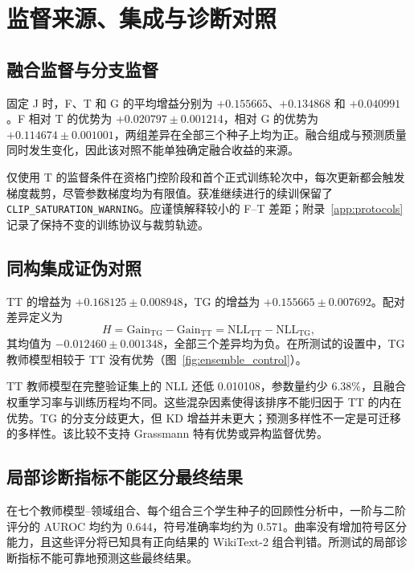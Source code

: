 \section{监督来源、集成与诊断对照}\label{sec:controls}

\subsection{融合监督与分支监督}
\label{sec:source-ablation}
固定 J 时，F、T 和 G 的平均增益分别为 $+0.155665$、$+0.134868$ 和 $+0.040991$。F 相对 T 的优势为 $+0.020797\pm0.001214$，相对 G 的优势为 $+0.114674\pm0.001001$，两组差异在全部三个种子上均为正。融合组成与预测质量同时发生变化，因此该对照不能单独确定融合收益的来源。

仅使用 T 的监督条件在资格门控阶段和首个正式训练轮次中，每次更新都会触发梯度裁剪，尽管参数梯度均为有限值。获准继续进行的续训保留了 \texttt{CLIP\_SATURATION\_WARNING}。应谨慎解释较小的 F--T 差距；附录~\ref{app:protocols} 记录了保持不变的训练协议与裁剪轨迹。

\subsection{同构集成证伪对照}
\label{sec:homogeneous-control}
TT 的增益为 $+0.168125\pm0.008948$，TG 的增益为 $+0.155665\pm0.007692$。配对差异定义为
\begin{equation}
H=\mathrm{Gain}_{\mathrm{TG}}-\mathrm{Gain}_{\mathrm{TT}}
=\mathrm{NLL}_{\mathrm{TT}}-\mathrm{NLL}_{\mathrm{TG}},
\label{eq:ensemble-contrast}
\end{equation}
其均值为 $-0.012460\pm0.001348$，全部三个差异均为负。在所测试的设置中，TG 教师模型相较于 TT 没有优势（图~\ref{fig:ensemble_control}）。

TT 教师模型在完整验证集上的 NLL 还低 0.010108，参数量约少 6.38\%，且融合权重学习率与训练历程均不同。这些混杂因素使得该排序不能归因于 TT 的内在优势。TG 的分支分歧更大，但 KD 增益并未更大；预测多样性不一定是可迁移的多样性。该比较不支持 Grassmann 特有优势或异构监督优势。

\subsection{局部诊断指标不能区分最终结果}
\label{sec:local-diagnostics}
在七个教师模型--领域组合、每个组合三个学生种子的回顾性分析中，一阶与二阶评分的 AUROC 均约为 0.644，符号准确率均约为 0.571。曲率没有增加符号区分能力，且这些评分将已知具有正向结果的 WikiText-2 组合判错。所测试的局部诊断指标不能可靠地预测这些最终结果。


